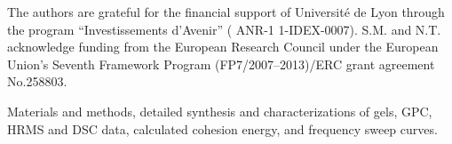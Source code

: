 \documentclass[journal=jacsat,manuscript=article]{achemso}
\begin{document}
\begin{acknowledgement}
The authors are grateful for the financial support of Université de Lyon through the program ``Investissements d'Avenir'' ( ANR-1 1-IDEX-0007). S.M. and N.T. acknowledge funding from the European Research Council under the European Union's Seventh Framework Program (FP7/2007–2013)/ERC grant agreement No.258803.
\end{acknowledgement}

\begin{suppinfo}

Materials and methods, detailed synthesis and characterizations of gels, GPC, HRMS and DSC data, calculated cohesion energy, and frequency sweep curves.

\end{suppinfo}


\end{document}
